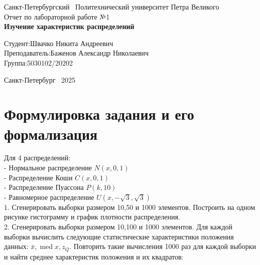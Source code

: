 \documentclass[a4paper]{article}
\begin{document}
    \begin{titlepage}
        \Large
        \begin{center}
            Санкт-Петербургский \ Политехнический университет Петра Великого\\
            \vspace{10em}Отчет по лабораторной работе №1\\
            \vspace{2em}
            \textbf{Изучение характеристик распределений}
        \end{center}
        \vspace{6em}
        \hfill\parbox{10cm}{
            \hspace*{2cm}\hspace*{-4cm}Студент:\hfill Швачко Никита Андреевич\\
            \hspace*{2cm}\hspace*{-4cm}Преподаватель:\hfill Баженов Александр Николаевич\\
            \hspace*{2cm}\hspace*{-4cm}Группа:\hfill 5030102/20202
        }
        \vspace{\fill}
        \begin{center}
            Санкт-Петербург \ 2025
        \end{center}
    \end{titlepage}


    \section{Формулировка задания и его формализация}\label{sec:----2}
    Для 4 распределений:
    \\- Нормальное распределение $N(x, 0,1)$
    \\- Распределение Коши $C(x, 0,1)$
    \\- Распределение Пуассона $P(k, 10)$
    \\- Равномерное распределение $U(x,-\sqrt{3}, \sqrt{3})$
    \\1. Сгенерировать выборки размером 10,50 и 1000 элементов. Построить на одном рисунке гистограмму и график плотности распределения.
    \\2. Сгенерировать выборки размером 10,100 и 1000 элементов. Для каждой выборки вычислить следующие статистические характеристики положения данных:
    $\bar{x}, \operatorname{med} x, z_Q$. Повторить такие вычисления 1000 раз для каждой выборки и найти среднее характеристик положения и их квадратов:
\end{document}
